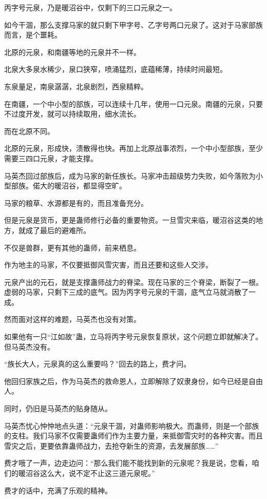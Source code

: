 \begin{this_body}
丙字号元泉，乃是暖沼谷中，仅剩下的三口元泉之一。

如今干涸，那么支撑马家的就只剩下甲字号、乙字号两口元泉了。这对于马家部族而言，是个噩耗。

北原的元泉，和南疆等地的元泉并不一样。

北泉大多泉水稀少，泉口狭窄，喷涌猛烈，底蕴稀薄，持续时间最短。

东泉量足，南泉潺潺，北泉剧烈，西泉精粹。

在南疆，一个中小型的部族，可以连续十几年，使用一口元泉。南疆的元泉，只要不过度开发，就可以持续取用，细水流长。

而在北原不同。

北原的元泉，形成快，溃散得也快。再加上北原战事浓烈，一个中小型部族，至少需要三四口元泉，才能支撑。

马英杰回过部族后，成为马家的新任族长。马家冲击超级势力失败，如今落败为小型部族。偌大的暖沼谷，都显得空旷。

马家的粮草、水源都是有的，而且准备充分。

但是元泉是货币，更是蛊师修行必备的重要物资。一旦雪灾来临，暖沼谷这类的地方，就成了最后的避难所。

不仅是兽群，更有其他的蛊师，前来栖息。

作为地主的马家，不仅要抵御风雪灾害，而且还要和这些人交涉。

元泉产出的元石，就是支撑蛊师战力的脊梁。现在马家的三个脊梁，断裂了一根。虚弱的马家，只剩下三成的底气。因为丙字号元泉的干涸，底气立马就消散了一成。

然而面对这样的难题，马英杰也没有对策。

如果他有一只“江如故”蛊，立马将丙字号元泉恢复原状，这个问题立即就解决了。但马英杰没有。

“族长大人，元泉真的这么重要吗？”回去的路上，费才问。

他回归家族之后，作为马英杰的救命恩人，立即解除了奴隶身份，如今已经是自由人。

同时，仍旧是马英杰的贴身随从。

马英杰忧心忡忡地点头道：“元泉干涸，对蛊师影响极大。而蛊师，则是一个部族的支柱。我们马家不仅需要蛊师们作为主要力量，来抵御雪灾时的各种灾害。而且雪灾之后，更要依靠蛊师战力，去抢夺新生的资源，去发展部族……”

费才哦了一声，边走边问：“那么我们能不能找到新的元泉呢？我是说，您看，咱们的暖沼谷这么大，说不定不止这三道元泉呢。”

费才的话中，充满了乐观的精神。


\end{this_body}
